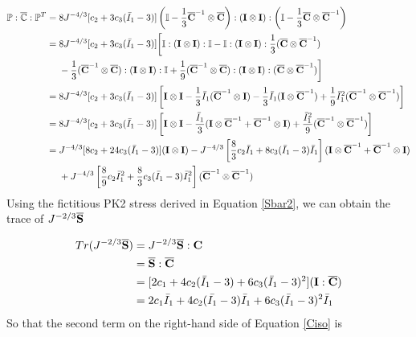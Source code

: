 \begin{equation} \label{part12}
\begin{split}
\mathbb{P} : \overline{\mathbb{C}} : {\mathbb{P}}^T 
= {}& 8J^{-4/3}[c_2 + 3c_3({\bar{I}}_1 - 3 )] \left( \mathbb{I} - \frac{1}{3}{\overline{\bold{C}}}^{-1} \otimes {\overline{\bold{C}}} \right) : (\bold{I} \otimes \bold{I}): \left(\mathbb{I} - \frac{1}{3}{\overline{\bold{C}}} \otimes {\overline{\bold{C}}}^{-1}\right) \\
= {}& 8J^{-4/3}[c_2 + 3c_3({\bar{I}}_1 - 3 )] \bigg[\mathbb{I}:(\bold{I} \otimes \bold{I}):\mathbb{I} - \mathbb{I}:(\bold{I} \otimes \bold{I}): \frac{1}{3} ({\overline{\bold{C}}} \otimes {\overline{\bold{C}}}^{-1}) \\
&- \frac{1}{3} ({\overline{\bold{C}}}^{-1} \otimes {\overline{\bold{C}}}) : (\bold{I} \otimes \bold{I}) : \mathbb{I} +  \frac{1}{9} ({\overline{\bold{C}}}^{-1} \otimes {\overline{\bold{C}}}) : (\bold{I} \otimes \bold{I}) : ({\overline{\bold{C}}} \otimes {\overline{\bold{C}}}^{-1}) \bigg] \\
= {}& 8J^{-4/3}[c_2 + 3c_3({\bar{I}}_1 - 3 )] \left[ \bold{I} \otimes \bold{I} - \frac{1}{3}\bar{I}_1({\overline{\bold{C}}}^{-1} \otimes \bold{I}) - \frac{1}{3}\bar{I}_1 (\bold{I} \otimes {\overline{\bold{C}}}^{-1}) + \frac{1}{9}{\bar{I}_1}^2({\overline{\bold{C}}}^{-1} \otimes {\overline{\bold{C}}}^{-1}) \right] \\
= {}& 8J^{-4/3} [c_2 + 3c_3({\bar{I}}_1 - 3 )] \left[ \bold{I} \otimes \bold{I} - \frac{{\bar{I}}_1}{3}(\bold{I} \otimes {\overline{\bold{C}}}^{-1} +{\overline{\bold{C}}}^{-1}  \otimes  \bold{I}) + \frac{{{\bar{I}}_1}^2}{9} ({\overline{\bold{C}}}^{-1} \otimes {\overline{\bold{C}}}^{-1}) \right] \\
= {}&  J^{-4/3}[8c_2 + 24c_3({\bar{I}}_1 - 3 )] (\bold{I} \otimes \bold{I} ) -  J^{-4/3} \left[ \frac{8}{3}c_2{\bar{I}}_1 + 8c_3({\bar{I}}_1 - 3 ){\bar{I}}_1 \right] (\bold{I} \otimes {\overline{\bold{C}}}^{-1} +{\overline{\bold{C}}}^{-1}  \otimes  \bold{I}) \\
&+
J^{-4/3} \left[ \frac{8}{9}c_2{\bar{I}_1}^2 + \frac{8}{3}c_3({\bar{I}}_1 - 3 ){\bar{I}_1}^2 \right] ({\overline{\bold{C}}}^{-1} \otimes {\overline{\bold{C}}}^{-1})
\end{split}
\end{equation}
Using the fictitious PK2 stress derived in Equation \ref{Sbar2}, we can obtain the trace of $J^{-2/3}\overline{\bold{S}}$

\begin{equation}
\begin{split}
Tr(J^{-2/3}\overline{\bold{S}}) &= J^{-2/3}\overline{\bold{S}}:\bold{C} \\
&= \overline{\bold{S}} : \overline{\bold{C}} \\
&=  [2c_1 + 4c_2(\bar{I}_1 - 3) + 6c_3(\bar{I}_1 - 3)^2] (\bold{I} : \overline{\bold{C}}) \\
&= 2c_1\bar{I}_1 + 4c_2(\bar{I_1} - 3)\bar{I}_1 + 6c_3(\bar{I}_1 - 3)^2\bar{I}_1
\end{split}
\end{equation}
So that the second term on the right-hand side of Equation \ref{Ciso} is

